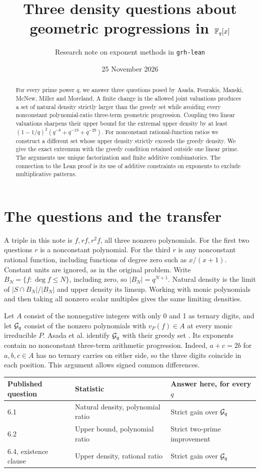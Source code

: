 \documentclass[11pt]{article}
\title{\color{ink}\textbf{Three density questions about geometric progressions in $\mathbb F_q[x]$}}
\author{Research note on exponent methods in \texttt{grh-lean}}
\date{25 November 2026}
\begin{document}
\maketitle
\begin{abstract}
For every prime power $q$, we answer three questions posed by Asada, Fourakis, Manski, McNew, Miller and Moreland. A finite change in the allowed joint valuations produces a set of natural density strictly larger than the greedy set while avoiding every nonconstant polynomial-ratio three-term geometric progression. Coupling two linear valuations sharpens their upper bound for the extremal upper density by at least $(1-1/q)^2(q^{-8}+q^{-19}+q^{-29})$. For nonconstant rational-function ratios we construct a different set whose upper density strictly exceeds the greedy density. We give the exact extremum with the greedy condition retained outside one linear prime. The arguments use unique factorization and finite additive combinatorics. The connection to the Lean proof is its use of additive constraints on exponents to exclude multiplicative patterns.
\end{abstract}

\section{The questions and the transfer}
A triple in this note is $f,rf,r^2f$, all three nonzero polynomials. For the first two questions $r$ is a nonconstant polynomial. For the third $r$ is any nonconstant rational function, including functions of degree zero such as $x/(x+1)$. Constant units are ignored, as in the original problem. Write $B_N=\{f:\deg f\le N\}$, including zero, so $|B_N|=q^{N+1}$. Natural density is the limit of $|S\cap B_N|/|B_N|$ and upper density its limsup. Working with monic polynomials and then taking all nonzero scalar multiples gives the same limiting densities.

Let $A$ consist of the nonnegative integers with only 0 and 1 as ternary digits, and let $\mathcal G_q$ consist of the nonzero polynomials with $v_P(f)\in A$ at every monic irreducible $P$. Asada et al. identify $\mathcal G_q$ with their greedy set \cite[Thm.~2.2]{asada}. Its exponents contain no nonconstant three-term arithmetic progression. Indeed, $a+c=2b$ for $a,b,c\in A$ has no ternary carries on either side, so the three digits coincide in each position. This argument allows signed common differences.
\begin{center}
\begin{tabular}{@{}lll@{}}\toprule
Published question & Statistic & Answer here, for every $q$\\\midrule
6.1 & Natural density, polynomial ratio & Strict gain over $\mathcal G_q$\\
6.2 & Upper bound, polynomial ratio & Strict two-prime improvement\\
6.4, existence clause & Upper density, rational ratio & Strict gain over $\mathcal G_q$\\\bottomrule
\end{tabular}
\end{center}
\end{document}
